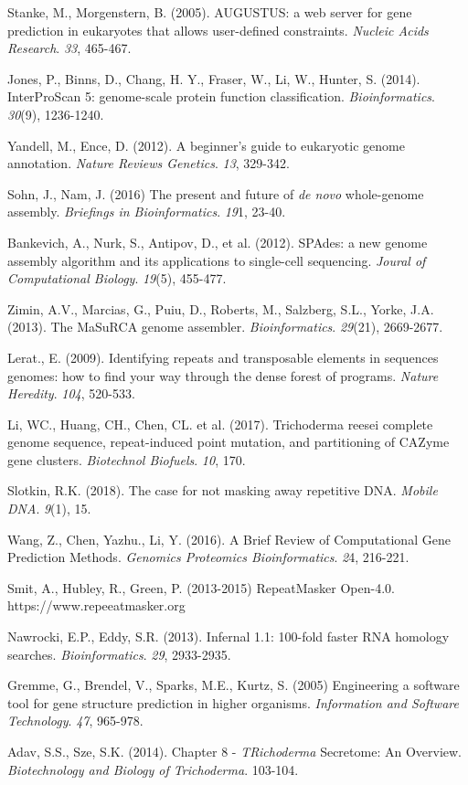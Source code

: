 \documentclass[12pt]{article}
\begin{document}
\begin{thebibliography}{99}
 Stanke, M., Morgenstern, B. (2005). AUGUSTUS: a web
  server for gene prediction in eukaryotes that allows user-defined
  constraints. \textit{Nucleic Acids Research}. \textit{33}, 465-467.
  
 Jones, P., Binns, D., Chang, H. Y., Fraser,
  W., Li, W., Hunter, S. (2014). InterProScan 5: genome-scale
  protein function
  classification. \textit{Bioinformatics}. \textit{30}(9),
  1236-1240.

 Yandell, M., Ence, D. (2012). A beginner's
  guide to eukaryotic genome annotation. \textit{Nature Reviews
    Genetics}. \textit{13}, 329-342.
  
 Sohn, J., Nam, J. (2016) The present and future of
  \textit{de novo} whole-genome assembly. \textit{Briefings in
    Bioinformatics}. \textit{19}1, 23-40.

 Bankevich, A., Nurk, S., Antipov, D., et
  al. (2012). SPAdes: a new genome assembly algorithm and its
  applications to single-cell sequencing. \textit{Joural of
    Computational Biology}. \textit{19}(5), 455-477. 
  
 Zimin, A.V., Marcias, G., Puiu, D., Roberts, M.,
  Salzberg, S.L., Yorke, J.A. (2013). The MaSuRCA genome
  assembler. \textit{Bioinformatics}. \textit{29}(21), 2669-2677.
  
 Lerat., E. (2009). Identifying repeats and
  transposable elements in sequences genomes: how to find your way
  through the dense forest of programs. \textit{Nature
    Heredity}. \textit{104}, 520-533.

 Li, WC., Huang, CH., Chen, CL. et
  al. (2017). Trichoderma reesei complete genome sequence,
  repeat-induced point mutation, and partitioning of CAZyme gene
  clusters. \textit{Biotechnol Biofuels}. \textit{10}, 170.

 Slotkin, R.K. (2018). The case for not masking away
  repetitive DNA. \textit{Mobile DNA}. \textit{9}(1), 15.
  
 Wang, Z., Chen, Yazhu., Li, Y. (2016). A Brief
  Review of Computational Gene Prediction Methods. \textit{Genomics
    Proteomics Bioinformatics}. \textit{2}4, 216-221.

 Smit, A., Hubley, R., Green, P. (2013-2015)
  RepeatMasker Open-4.0. https://www.repeeatmasker.org

 Nawrocki, E.P., Eddy, S.R. (2013). Infernal 1.1:
  100-fold faster RNA homology
  searches. \textit{Bioinformatics}. \textit{29}, 2933-2935.

 Gremme, G., Brendel, V., Sparks, M.E., Kurtz,
  S. (2005) Engineering a software tool for gene structure prediction
  in higher organisms. \textit{Information and Software
    Technology}. \textit{47}, 965-978.

 Adav, S.S., Sze, S.K. (2014). Chapter 8 -
  \textit{TRichoderma} Secretome: An Overview. \textit{Biotechnology
    and Biology of Trichoderma}. 103-104. 
  
\end{thebibliography}
\end{document}
